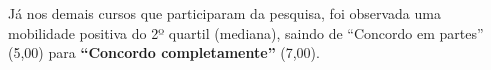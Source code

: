 Já nos demais cursos que participaram da pesquisa, foi observada uma mobilidade positiva do 2º quartil (mediana), saindo de “Concordo em partes” (5,00) para \textbf{“Concordo completamente”} (7,00).







